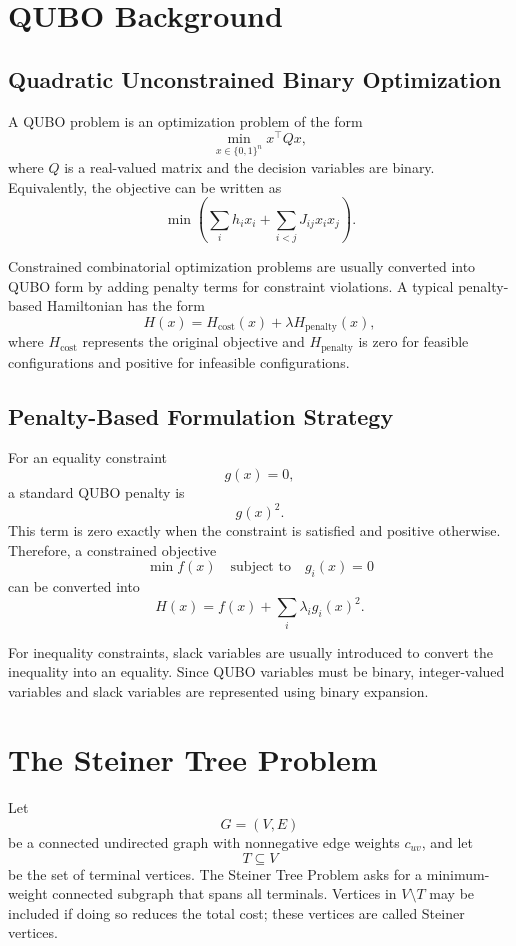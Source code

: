 \documentclass[a4paper,12pt]{report}
\begin{document}
\section{QUBO Background}

\subsection{Quadratic Unconstrained Binary Optimization}

A QUBO problem is an optimization problem of the form
\[
\min_{x \in \{0,1\}^n} x^\top Q x,
\]
where \(Q\) is a real-valued matrix and the decision variables are binary. Equivalently, the objective can be written as
\[
\min
\left(
\sum_i h_i x_i
+
\sum_{i<j} J_{ij}x_i x_j
\right).
\]

Constrained combinatorial optimization problems are usually converted into QUBO form by adding penalty terms for constraint violations. A typical penalty-based Hamiltonian has the form
\[
H(x)
=
H_{\text{cost}}(x)
+
\lambda H_{\text{penalty}}(x),
\]
where \(H_{\text{cost}}\) represents the original objective and \(H_{\text{penalty}}\) is zero for feasible configurations and positive for infeasible configurations.

\subsection{Penalty-Based Formulation Strategy}

For an equality constraint
\[
g(x)=0,
\]
a standard QUBO penalty is
\[
g(x)^2.
\]
This term is zero exactly when the constraint is satisfied and positive otherwise. Therefore, a constrained objective
\[
\min f(x)
\quad \text{subject to} \quad
g_i(x)=0
\]
can be converted into
\[
H(x)
=
f(x)
+
\sum_i \lambda_i g_i(x)^2.
\]

For inequality constraints, slack variables are usually introduced to convert the inequality into an equality. Since QUBO variables must be binary, integer-valued variables and slack variables are represented using binary expansion.

\section{The Steiner Tree Problem}

Let
\[
G=(V,E)
\]
be a connected undirected graph with nonnegative edge weights \(c_{uv}\), and let
\[
T\subseteq V
\]
be the set of terminal vertices. The Steiner Tree Problem asks for a minimum-weight connected subgraph that spans all terminals. Vertices in \(V\setminus T\) may be included if doing so reduces the total cost; these vertices are called Steiner vertices.
\end{document}
